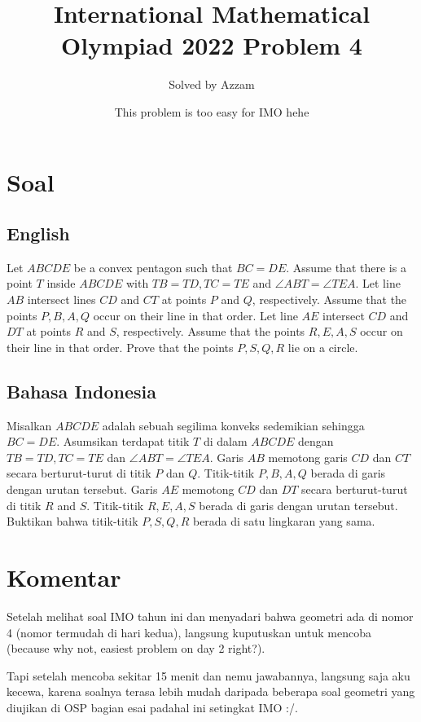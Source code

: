 \documentclass[12pt]{scrartcl}
\title{International Mathematical Olympiad 2022 Problem 4}
\author{Solved by Azzam}
\date{This problem is too easy for IMO hehe}
\begin{document}
\maketitle
\pagestyle{plain}
\vspace{-1.5cm}

\newpage
\section{Soal}
\subsection{English}
Let $ABCDE$ be a convex pentagon such that $BC=DE$. Assume that there is a point $T$ inside $ABCDE$ with $TB=TD,TC=TE$ and $\angle ABT = \angle TEA$. Let line $AB$ intersect lines $CD$ and $CT$ at points $P$ and $Q$, respectively. Assume that the points $P,B,A,Q$ occur on their line in that order. Let line $AE$ intersect $CD$ and $DT$ at points $R$ and $S$, respectively. Assume that the points $R,E,A,S$ occur on their line in that order. Prove that the points $P,S,Q,R$ lie on a circle.

\subsection{Bahasa Indonesia}
Misalkan $ABCDE$ adalah sebuah segilima konveks sedemikian sehingga $BC=DE$. Asumsikan terdapat titik $T$ di dalam $ABCDE$ dengan $TB=TD,TC=TE$ dan $\angle ABT = \angle TEA$. Garis $AB$ memotong garis $CD$ dan $CT$ secara berturut-turut di titik $P$ dan $Q$. Titik-titik $P,B,A,Q$ berada di garis dengan urutan tersebut. Garis $AE$ memotong $CD$ dan $DT$ secara berturut-turut di titik $R$ and $S$. Titik-titik $R,E,A,S$ berada di garis dengan urutan tersebut. Buktikan bahwa titik-titik $P,S,Q,R$ berada di satu lingkaran yang sama.

\newpage
\section{Komentar}
Setelah melihat soal IMO tahun ini dan menyadari bahwa geometri ada di nomor 4 (nomor termudah di hari kedua), langsung kuputuskan untuk mencoba (because why not, easiest problem on day 2 right?).

Tapi setelah mencoba sekitar 15 menit dan nemu jawabannya, langsung saja aku kecewa, karena soalnya terasa lebih mudah daripada beberapa soal geometri yang diujikan di OSP bagian esai padahal ini setingkat IMO :/.
\end{document}
